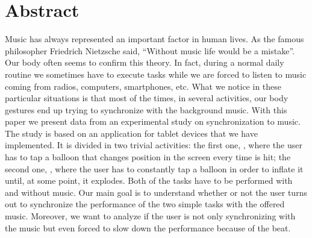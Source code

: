 \section*{Abstract}

Music has  always represented an important factor in human lives. As the famous philosopher Friedrich Nietzsche said, ``Without music life would be a mistake''. Our body often seems to confirm this theory. In fact, during a normal daily routine we sometimes have to execute tasks while we are forced to listen to music coming from radios, computers, smartphones, etc. What we notice in these particular situations is that most of the times, in several activities, our body gestures end up trying to synchronize with the background music. With this paper we present data from an experimental study on synchronization to music. The study is based on an application for tablet devices that we have implemented. It is divided in two trivial activities: the first one, \emph{\testfirst}, where the user has to tap a balloon that changes position in the screen every time is hit; the second one, \emph{\testsecond}, where the user has to constantly tap a balloon in order to inflate it until, at some point, it explodes. Both of the tasks have to be performed  with and without music. Our main goal is to understand whether or not the user turns out to synchronize the performance of the two simple tasks with the offered music. Moreover, we want to analyze if the user is not only synchronizing with the music but even forced to slow down the performance because of the beat.